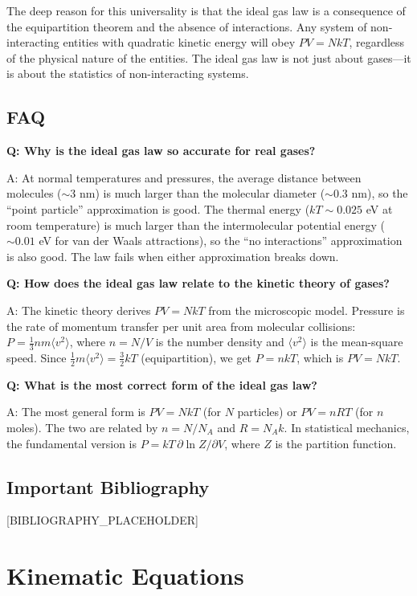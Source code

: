 \documentclass[11pt,openright]{book}
\begin{document}
The deep reason for this universality is that the ideal gas law is a consequence of the equipartition theorem and the absence of interactions. Any system of non-interacting entities with quadratic kinetic energy will obey $PV = NkT$, regardless of the physical nature of the entities. The ideal gas law is not just about gases---it is about the statistics of non-interacting systems.

\section*{FAQ}

\textbf{Q: Why is the ideal gas law so accurate for real gases?}

A: At normal temperatures and pressures, the average distance between molecules ($\sim 3$ nm) is much larger than the molecular diameter ($\sim 0.3$ nm), so the ``point particle'' approximation is good. The thermal energy ($kT \sim 0.025$ eV at room temperature) is much larger than the intermolecular potential energy ($\sim 0.01$ eV for van der Waals attractions), so the ``no interactions'' approximation is also good. The law fails when either approximation breaks down.

\textbf{Q: How does the ideal gas law relate to the kinetic theory of gases?}

A: The kinetic theory derives $PV = NkT$ from the microscopic model. Pressure is the rate of momentum transfer per unit area from molecular collisions: $P = \frac{1}{3}nm\langle v^2\rangle$, where $n = N/V$ is the number density and $\langle v^2\rangle$ is the mean-square speed. Since $\frac{1}{2}m\langle v^2\rangle = \frac{3}{2}kT$ (equipartition), we get $P = nkT$, which is $PV = NkT$.

\textbf{Q: What is the most correct form of the ideal gas law?}

A: The most general form is $PV = NkT$ (for $N$ particles) or $PV = nRT$ (for $n$ moles). The two are related by $n = N/N_A$ and $R = N_Ak$. In statistical mechanics, the fundamental version is $P = kT\,\partial\ln Z/\partial V$, where $Z$ is the partition function.
\section*{Important Bibliography}

[BIBLIOGRAPHY_PLACEHOLDER]


\chapter{Kinematic Equations}
\end{document}
